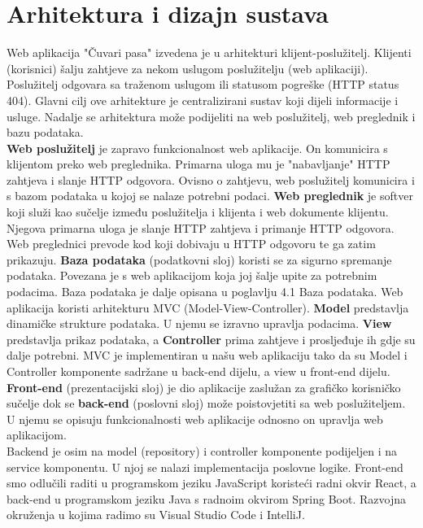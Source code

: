 \chapter{Arhitektura i dizajn sustava}

		Web aplikacija "Čuvari pasa" izvedena je u arhitekturi klijent-poslužitelj. Klijenti (korisnici) šalju zahtjeve za nekom uslugom poslužitelju (web aplikaciji). Poslužitelj odgovara sa traženom uslugom ili statusom pogreške (HTTP status 404). Glavni cilj ove arhitekture je centralizirani sustav koji dijeli informacije i usluge.
		Nadalje se arhitektura može podijeliti na web poslužitelj, web preglednik i bazu podataka.\\
		\newline
		\textbf{Web poslužitelj} je zapravo funkcionalnost web aplikacije. On komunicira s klijentom preko web preglednika. Primarna uloga mu je "nabavljanje" HTTP zahtjeva i slanje HTTP odgovora. Ovisno o zahtjevu, web poslužitelj komunicira i s bazom podataka u kojoj se nalaze potrebni podaci. 
		\newline
		\textbf{Web preglednik} je softver koji služi kao sučelje između poslužitelja i klijenta i web dokumente klijentu. Njegova primarna uloga je slanje HTTP zahtjeva i primanje HTTP odgovora. Web preglednici prevode kod koji dobivaju u HTTP odgovoru te ga zatim prikazuju.
		\newline
		\textbf{Baza podataka} (podatkovni sloj) koristi se za sigurno spremanje podataka. Povezana je s web aplikacijom koja joj šalje upite za potrebnim podacima. Baza podataka je dalje opisana u poglavlju 4.1 Baza podataka.
		\newline
		\newline
		Web aplikacija koristi arhitekturu MVC (Model-View-Controller). \textbf{Model} predstavlja dinamičke strukture podataka. U njemu se izravno upravlja podacima.
		\textbf{View} predstavlja prikaz podataka, a \textbf{Controller} prima zahtjeve i prosljeđuje ih gdje su dalje potrebni. MVC je implementiran u našu web aplikaciju tako da su Model i Controller komponente sadržane u back-end dijelu, a view u front-end dijelu. \textbf{Front-end} (prezentacijski sloj) je dio aplikacije zaslužan za grafičko korisničko sučelje dok se \textbf{back-end} (poslovni sloj) može poistovjetiti sa web poslužiteljem. U njemu se opisuju funkcionalnosti web aplikacije odnosno on upravlja web aplikacijom.\\
		Backend je osim na model (repository) i controller komponente podijeljen i na service komponentu. U njoj se nalazi implementacija poslovne logike.
		\newline
		Front-end smo odlučili raditi u programskom jeziku JavaScript koristeći radni okvir React, a back-end u programskom jeziku Java s radnoim okvirom Spring Boot. Razvojna okruženja u kojima radimo su Visual Studio Code i IntelliJ.
		
